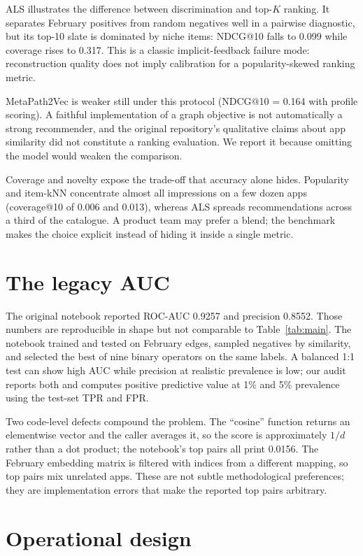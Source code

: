 \documentclass[11pt]{article}
\begin{document}
ALS illustrates the difference between discrimination and top-$K$ ranking. It separates February positives from random negatives well in a pairwise diagnostic, but its top-10 slate is dominated by niche items: NDCG@10 falls to 0.099 while coverage rises to 0.317. This is a classic implicit-feedback failure mode: reconstruction quality does not imply calibration for a popularity-skewed ranking metric.

MetaPath2Vec is weaker still under this protocol (NDCG@10 = 0.164 with profile scoring). A faithful implementation of a graph objective is not automatically a strong recommender, and the original repository's qualitative claims about app similarity did not constitute a ranking evaluation. We report it because omitting the model would weaken the comparison.

Coverage and novelty expose the trade-off that accuracy alone hides. Popularity and item-kNN concentrate almost all impressions on a few dozen apps (coverage@10 of 0.006 and 0.013), whereas ALS spreads recommendations across a third of the catalogue. A product team may prefer a blend; the benchmark makes the choice explicit instead of hiding it inside a single metric.

\section{The legacy AUC}

The original notebook reported ROC-AUC 0.9257 and precision 0.8552. Those numbers are reproducible in shape but not comparable to Table~\ref{tab:main}. The notebook trained and tested on February edges, sampled negatives by similarity, and selected the best of nine binary operators on the same labels. A balanced 1:1 test can show high AUC while precision at realistic prevalence is low; our audit reports both and computes positive predictive value at 1\% and 5\% prevalence using the test-set TPR and FPR.

Two code-level defects compound the problem. The ``cosine'' function returns an elementwise vector and the caller averages it, so the score is approximately $1/d$ rather than a dot product; the notebook's top pairs all print 0.0156. The February embedding matrix is filtered with indices from a different mapping, so top pairs mix unrelated apps. These are not subtle methodological preferences; they are implementation errors that make the reported top pairs arbitrary.

\section{Operational design}
\end{document}
